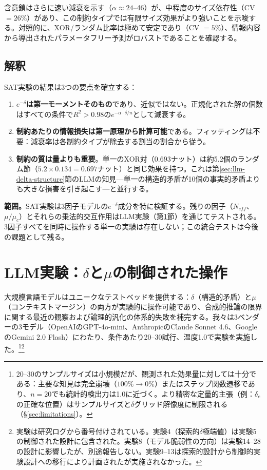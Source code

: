 \documentclass[11pt,a4paper]{article}
\begin{document}
含意鎖はさらに速い減衰を示す（$\alpha \approx 24$--46）が、中程度のサイズ依存性（CV $= 26\%$）があり、この制約タイプでは有限サイズ効果がより強いことを示唆する。対照的に、XOR/ランダム比率は極めて安定であり（CV $= 5\%$）、情報内容から導出されたパラメータフリー予測がロバストであることを確認する。

\subsection{解釈}

SAT実験の結果は3つの要点を確立する：

\begin{enumerate}
    \item \textbf{$e^{-\delta}$は第一モーメントそのもの}であり、近似ではない。正規化された解の個数はすべての条件で$R^2 > 0.98$の$e^{-\alpha \cdot \delta/n}$として減衰する。
    \item \textbf{制約あたりの情報損失は第一原理から計算可能}である。フィッティングは不要：減衰率は各制約タイプが除去する割当の割合から従う。
    \item \textbf{制約の質は量よりも重要}。単一のXOR対（$0.693$ナット）は約5.2個のランダム節（$5.2 \times 0.134 = 0.697$ナット）と同じ効果を持つ。これは第\ref{sec:llm-delta-structure}節のLLMの知見---単一の構造的矛盾が10個の事実的矛盾よりも大きな損害を引き起こす---と並行する。
\end{enumerate}

\noindent\textbf{範囲。}SAT実験は3因子モデルの$e^{-\delta}$成分を特に検証する。残りの因子（$N_{eff}$、$\mu/\mu_c$）とそれらの乗法的交互作用はLLM実験（第\ref{sec:llm}節）を通じてテストされる。3因子すべてを同時に操作する単一の実験は存在しない；この統合テストは今後の課題として残る。

\section{LLM実験：\texorpdfstring{$\delta$}{δ}と\texorpdfstring{$\mu$}{μ}の制御された操作}
\label{sec:llm}

大規模言語モデルはユニークなテストベッドを提供する：$\delta$（構造的矛盾）と$\mu$（コンテキストマージン）の両方が実験的に操作可能であり、合成的推論の限界に関する最近の観察\cite{dziri2023,wei2022}および論理的汎化の体系的失敗\cite{berglund2023}を補完する。我々は3ベンダーの3モデル（OpenAIのGPT-4o-mini、AnthropicのClaude Sonnet 4.6、GoogleのGemini 2.0 Flash）にわたり、条件あたり20--30試行、温度1.0で実験を実施した。\footnote{20--30のサンプルサイズは小規模だが、観測された効果量に対しては十分である：主要な知見は完全崩壊（$100\% \to 0\%$）またはステップ関数遷移であり、$n = 20$でも統計的検出力は1.0に近づく。より精密な定量的主張（例：$\delta_c$の正確な位置）はサンプルサイズと$\delta$グリッド解像度に制限される（\S\ref{sec:limitations}）。}\footnote{実験は研究ログから番号付けされている。実験4（探索的$\delta$極端値）は実験5の制御された設計に包含された。実験8（モデル脆弱性の方向）は実験14--28の設計に影響したが、別途報告しない。実験9--13は探索的設計から制御的実験設計への移行により計画されたが実施されなかった。}
\end{document}
